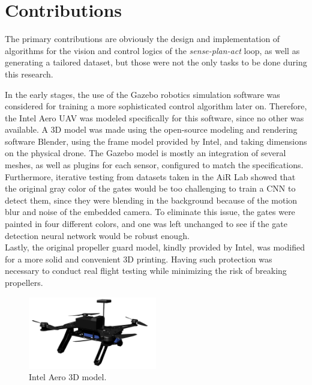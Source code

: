 \section{Contributions}

The primary contributions are obviously the design and implementation of
algorithms for the vision and control logics of the \emph{sense-plan-act} loop,
as well as generating a tailored dataset, but those were not the only tasks to
be done during this research.

In the early stages, the use of the Gazebo robotics simulation software was
considered for training a more sophisticated control algorithm later on.
Therefore, the Intel Aero UAV was modeled specifically for this software,
since no other was available. A 3D model was made using the open-source
modeling and rendering software Blender, using the frame model provided by
Intel, and taking dimensions on the physical drone. The Gazebo model is mostly
an integration of several meshes, as well as plugins for each sensor, configured
to match the specifications.
Furthermore, iterative testing from datasets taken in the AiR Lab showed that
the original gray color of the gates would be too challenging to train a CNN to
detect them, since they were blending in the background because of the motion
blur and noise of the embedded camera. To eliminate this issue, the gates were
painted in four different colors, and one was left unchanged to see if the gate
detection neural network would be robust enough.\\

Lastly, the original propeller guard model, kindly provided by Intel, was
modified for a more solid and convenient 3D printing. Having such protection was
necessary to conduct real flight testing while minimizing the risk of breaking
propellers.

\begin{figure}[b]
	\centering
	\includegraphics[width=0.5\textwidth]{figure/aero.png}
	\caption{Intel Aero 3D model.}
	\label{fig:aero}
\end{figure}


